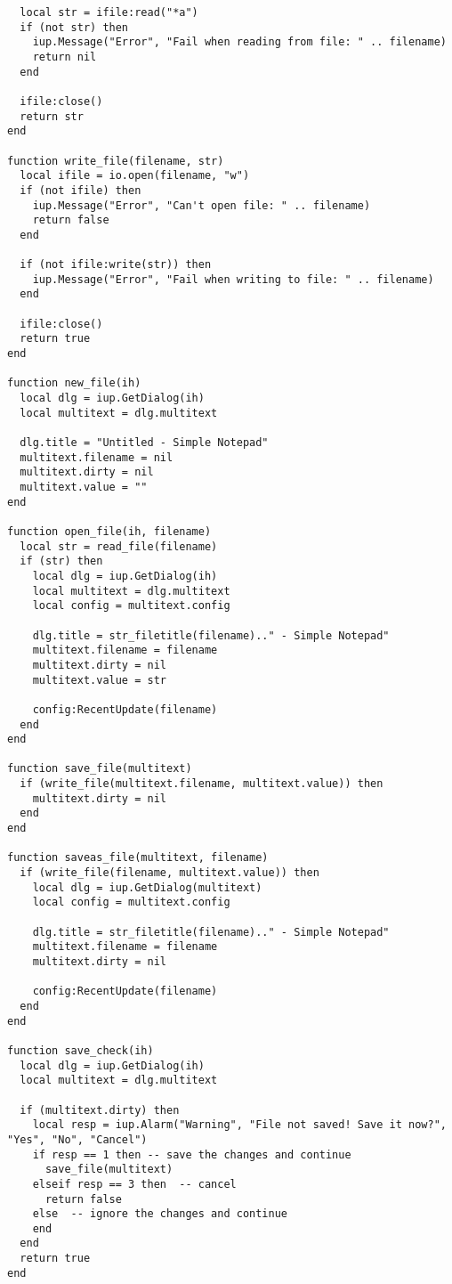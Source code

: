 \documentclass{ctexart}
\begin{document}
\begin{lstlisting}
  local str = ifile:read("*a")
  if (not str) then
    iup.Message("Error", "Fail when reading from file: " .. filename)
    return nil
  end
  
  ifile:close()
  return str
end

function write_file(filename, str)
  local ifile = io.open(filename, "w")
  if (not ifile) then
    iup.Message("Error", "Can't open file: " .. filename)
    return false
  end
  
  if (not ifile:write(str)) then
    iup.Message("Error", "Fail when writing to file: " .. filename)
  end
  
  ifile:close()
  return true
end

function new_file(ih)
  local dlg = iup.GetDialog(ih)
  local multitext = dlg.multitext
  
  dlg.title = "Untitled - Simple Notepad"
  multitext.filename = nil
  multitext.dirty = nil
  multitext.value = ""
end

function open_file(ih, filename)
  local str = read_file(filename)
  if (str) then
    local dlg = iup.GetDialog(ih)
    local multitext = dlg.multitext
    local config = multitext.config
  
    dlg.title = str_filetitle(filename).." - Simple Notepad"
    multitext.filename = filename
    multitext.dirty = nil
    multitext.value = str
    
    config:RecentUpdate(filename)
  end
end

function save_file(multitext)
  if (write_file(multitext.filename, multitext.value)) then
    multitext.dirty = nil
  end
end

function saveas_file(multitext, filename)
  if (write_file(filename, multitext.value)) then
    local dlg = iup.GetDialog(multitext)
    local config = multitext.config
    
    dlg.title = str_filetitle(filename).." - Simple Notepad"
    multitext.filename = filename
    multitext.dirty = nil
    
    config:RecentUpdate(filename)
  end
end

function save_check(ih)
  local dlg = iup.GetDialog(ih)
  local multitext = dlg.multitext
  
  if (multitext.dirty) then
    local resp = iup.Alarm("Warning", "File not saved! Save it now?", "Yes", "No", "Cancel")
    if resp == 1 then -- save the changes and continue
      save_file(multitext)
    elseif resp == 3 then  -- cancel
      return false
    else  -- ignore the changes and continue
    end
  end
  return true
end


\end{lstlisting}
\end{document}
